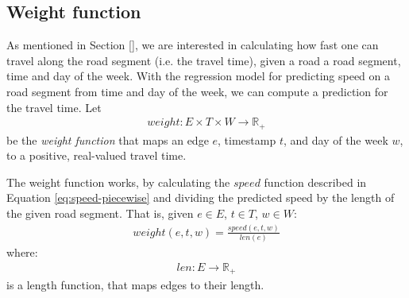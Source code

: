\subsection{Weight function}\label{sec:weight-function}
As mentioned in Section \ref{}, we are interested in calculating how fast one can travel along the road segment (i.e. the travel time), given a road a road segment, time and day of the week. With the regression model for predicting speed on a road segment from time and day of the week, we can compute a prediction for the travel time. Let 
\begin{align}
weight: E \times T \times W \rightarrow \mathbb{R_+}
\end{align}
be the \emph{weight function} that maps an edge $e$, timestamp $t$, and day of the week $w$, to a positive, real-valued travel time.

The weight function works, by calculating the $speed$ function described in Equation \ref{eq:speed-piecewise} and dividing the predicted speed by the length of the given road segment. That is, given $e \in E$, $t \in T$, $w \in W$:
\begin{align}
weight(e,t,w) = \frac{speed(e,t,w)}{len(e)}
\end{align}
where:
\begin{align}
len:E \rightarrow \mathbb{R_+}
\end{align}
is a length function, that maps edges to their length.